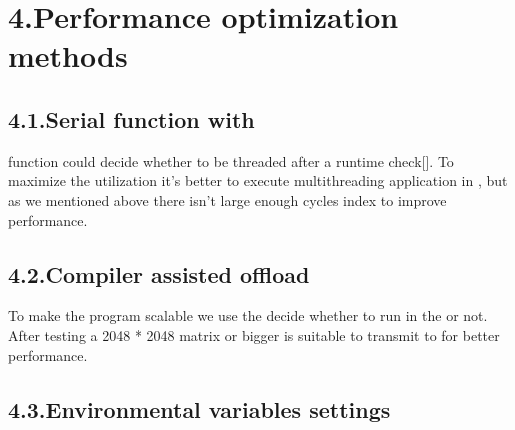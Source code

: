 \documentclass{article}
\begin{document}
\section{4.\hspace*{0.5em}Performance optimization methods}\label{sec-performance-optimization-methods}%

\subsection{4.1.\hspace*{0.5em}Serial  function with }\label{sec-serial-mkl-function-with-openmp}%

\noindent{} function could decide whether to be threaded after a runtime check[]. To maximize the utilization it's better to execute multithreading application in , but as we mentioned above there isn't large enough cycles index to improve performance.%

\subsection{4.2.\hspace*{0.5em}Compiler assisted offload}\label{sec-compiler-assisted-offload}%

\noindent{}To make the  program scalable we use  the decide whether to run in the  or not. After testing a 2048 * 2048 matrix or bigger is suitable to transmit to  for better performance.%

\subsection{4.3.\hspace*{0.5em}Environmental variables settings}\label{sec-environmental-variables-settings}%
\end{document}
